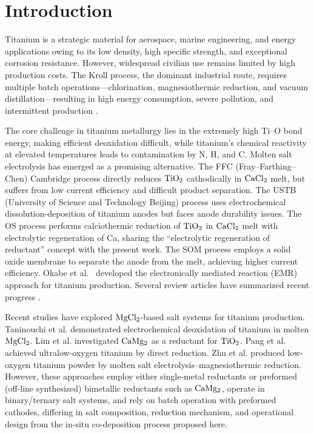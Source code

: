 \documentclass[pdflatex,sn-basic,Numbered]{sn-jnl}
\begin{document}
\section{Introduction}\label{sec:intro}

Titanium is a strategic material for aerospace, marine engineering, and energy applications owing to its low density, high specific strength, and exceptional corrosion resistance. However, widespread civilian use remains limited by high production costs. The Kroll process, the dominant industrial route, requires multiple batch operations---chlorination, magnesiothermic reduction, and vacuum distillation---resulting in high energy consumption, severe pollution, and intermittent production \cite{kroll1937,ji2026}.

The core challenge in titanium metallurgy lies in the extremely high Ti--O bond energy, making efficient deoxidation difficult, while titanium's chemical reactivity at elevated temperatures leads to contamination by N, H, and C. Molten salt electrolysis has emerged as a promising alternative. The FFC (Fray--Farthing--Chen) Cambridge process \cite{fray2000} directly reduces $\ce{TiO2}$ cathodically in $\ce{CaCl2}$ melt, but suffers from low current efficiency and difficult product separation. The USTB (University of Science and Technology Beijing) process \cite{jiao2023} uses electrochemical dissolution-deposition of titanium anodes but faces anode durability issues. The OS process \cite{ono2002} performs calciothermic reduction of $\ce{TiO2}$ in $\ce{CaCl2}$ melt with electrolytic regeneration of Ca, sharing the ``electrolytic regeneration of reductant'' concept with the present work. The SOM process \cite{pal2001} employs a solid oxide membrane to separate the anode from the melt, achieving higher current efficiency. Okabe et al.\ \cite{okabe1997} developed the electronically mediated reaction (EMR) approach for titanium production. Several review articles have summarized recent progress \cite{ji2026,zhang2024}.

Recent studies have explored $\ce{MgCl2}$-based salt systems for titanium production. Taninouchi et al. \cite{taninouchi2016} demonstrated electrochemical deoxidation of titanium in molten $\ce{MgCl2}$. Lim et al. \cite{lee2025} investigated $\ce{CaMg2}$ as a reductant for $\ce{TiO2}$. Pang et al. \cite{pang2024} achieved ultralow-oxygen titanium by direct reduction. Zhu et al. \cite{xu2025} produced low-oxygen titanium powder by molten salt electrolysis--magnesiothermic reduction. However, these approaches employ either single-metal reductants or preformed (off-line synthesized) bimetallic reductants such as $\ce{CaMg2}$, operate in binary/ternary salt systems, and rely on batch operation with preformed cathodes, differing in salt composition, reduction mechanism, and operational design from the in-situ co-deposition process proposed here.
\end{document}
